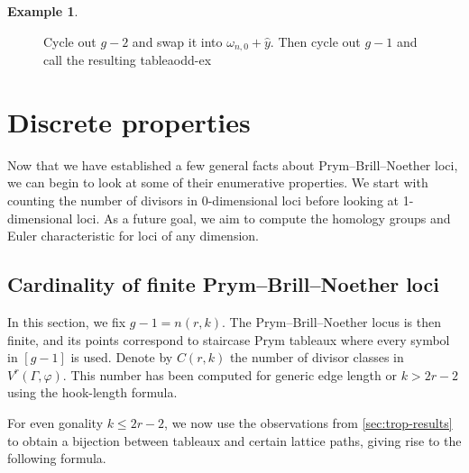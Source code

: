 \documentclass[11pt,reqno]{amsart}
\newcommand{\derek}[1]{{\color{Green} \sf D: [#1]}}
\newcommand{\steven}[1]{\textcolor{pink}{\sf S: [#1]}}
\theoremstyle{definition}
\theoremstyle{problem}
\newtheorem{example}[definition]{Example}
\theoremstyle{plain}
\theoremstyle{remark}
\theoremstyle{theorem}
\numberwithin{equation}{section}
\numberwithin{figure}{section}
\theoremstyle{definition}
\theoremstyle{problem}
\newtheorem{example}[definition]{Example}
\theoremstyle{plain}
\begin{document}
\begin{example}
\begin{figure}[H]
{    	Cycle out $g-2$ and swap it into $\omega_{n,0} + \hat y$.  Then
    	cycle out $g-1$ and call the resulting tableaodd-ex}
  \end{figure}
\end{example}

\section{Discrete properties}\label{sec:counting}

Now that we have established a few general facts about Prym--Brill--Noether loci, we can begin to look at some of their enumerative properties. We start with counting the number of divisors in 0-dimensional loci before looking at 1-dimensional loci. As a future goal, we aim to compute the homology groups and Euler characteristic for loci of any dimension. 

\subsection{Cardinality of finite Prym--Brill--Noether loci}

In this section, we fix $g-1=n(r,k)$. The Prym--Brill--Noether locus is then finite, and its points correspond to staircase Prym
tableaux where every symbol in $[g-1]$ is used. Denote by $C(r,k)$ the number of divisor classes in $V^r(\Gamma,\varphi)$. 
This number has been computed \cite[Corollary~6.1.5]{len2019skeletons} for generic edge length or $k>2r-2$ using the hook-length formula. 

 For even gonality $k\leq 2r-2$, we now use the observations from \cref{sec:trop-results} to obtain a bijection between tableaux and certain lattice paths, giving rise to the following formula. 



\end{document}
